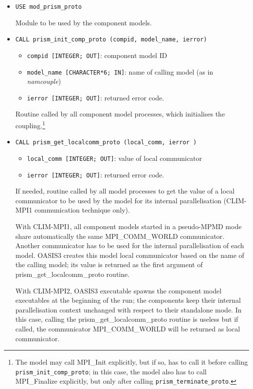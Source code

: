 \begin{itemize}

\item {\tt USE mod\_prism\_proto}
 
Module to be used by the component models. 

\item {\tt CALL prism\_init\_comp\_proto (compid, model\_name, ierror)} 

 \begin{itemize}
   \item {\tt compid [INTEGER; OUT]}: component model ID 
   \item {\tt model\_name [CHARACTER*6; IN]}: name of calling model (as in
  {\em namcouple}) 
   \item {\tt ierror [INTEGER; OUT]}: returned error code.
 \end{itemize}
 
Routine called by all component model processes, which initialises the
coupling.\footnote{The model may call MPI\_Init explicitly, but if so, has to
call it before calling {\tt prism\_init\_comp\_proto}; in this case, the
model also has to call MPI\_Finalize explicitly, but only after calling
{\tt prism\_terminate\_proto}.}

\item {\tt CALL prism\_get\_localcomm\_proto (local\_comm, ierror )}

 \begin{itemize}
   \item {\tt local\_comm [INTEGER; OUT]}: value of local communicator
   \item {\tt ierror [INTEGER; OUT]}: returned error code.
  \end{itemize}

  If needed, routine called by all model processes  
  to get the value of a local communicator to be used by the
  model for its internal parallelisation (CLIM-MPI1 communication technique only). 

  With CLIM-MPI1, all component models started in a
  pseudo-MPMD mode share automatically the same MPI\_COMM\_WORLD
  communicator.  Another communicator has to be used for the internal
  parallelisation of each model. OASIS3 creates this model local
  communicator based on the name of the calling model; its value is returned
  as the first argument of prism\_get\_localcomm\_proto routine.

  With CLIM-MPI2, OASIS3 executable spawns the component model executables at the
  beginning of the run; 
  the components keep their internal parallelisation context unchanged 
  with respect to their standalone mode. In this case, calling the prism\_get\_localcomm\_proto 
  routine is useless but if called, the communicator MPI\_COMM\_WORLD will be returned as
  local communicator.

\end{itemize}

